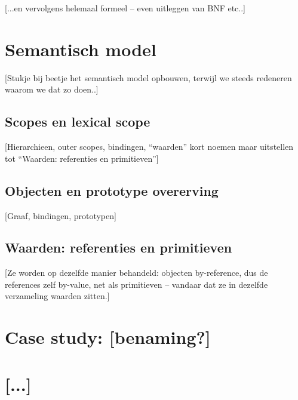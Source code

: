 \documentclass
  [11pt,
   paper=a4,
   cleardouble=plain,
   chapterprefix=true,
   parskip=half]
  {scrbook}
\newcommand{\<}
  {\ensuremath{\langle}}
\renewcommand{\>}
  {\ensuremath{\rangle}}
\begin{document}
[...en vervolgens helemaal formeel -- even uitleggen van BNF etc..]

\chapter{Semantisch model}

[Stukje bij beetje het semantisch model opbouwen, terwijl we steeds redeneren waarom we dat zo doen..]

\section{Scopes en lexical scope}

[Hierarchieen, outer scopes, bindingen, ``waarden'' kort noemen maar uitstellen tot ``Waarden: referenties en primitieven'']

\section{Objecten en prototype overerving}

[Graaf, bindingen, prototypen]

\section{Waarden: referenties en primitieven}

[Ze worden op dezelfde manier behandeld: objecten by-reference, dus de references zelf by-value, net als primitieven -- vandaar dat ze in dezelfde verzameling waarden zitten.]

\chapter{Case study: [benaming?]}

\chapter{[...]}

%
%
%

\backmatter
\end{document}
